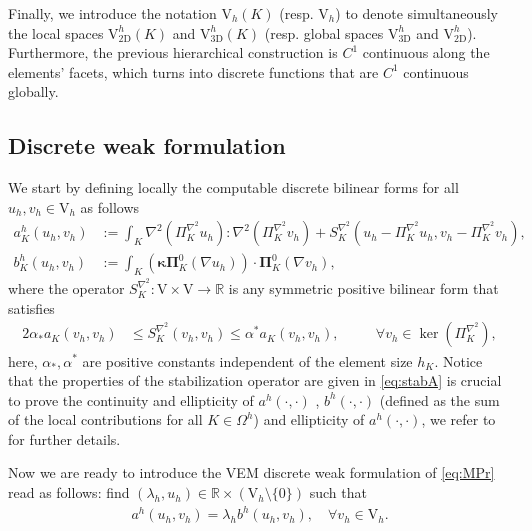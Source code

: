 \documentclass[final,reqno]{elsarticle}
\def\bkappa{\boldsymbol{\kappa}}
\def\bPi{\mathbf{\Pi}}
\def\rV{\mathrm{V}}
\begin{document}
Finally, we introduce the notation $\rV_h(K)$ (resp. $\rV_h$) to denote simultaneously the local spaces $\rV^h_{\mathrm{2D}}(K)$ and $\rV^h_{3\mathrm{D}}(K)$ (resp. global spaces $\rV^h_{\mathrm{3D}}$ and $\rV^h_{2\mathrm{D}}$).  
Furthermore, the previous hierarchical construction is $C^1$ continuous along the elements' facets, which turns into discrete functions that are $C^1$ continuous globally.

\subsection{Discrete weak formulation}
We start by defining locally the computable discrete bilinear forms for all $u_h,v_h\in\rV_h$ as follows
\begin{align*}
    a^h_K(u_h,v_h)&:=\int_{K}\nabla^2 (\Pi_{K}^{\nabla^2} u_h): \nabla^2 (\Pi_{K}^{\nabla^2} v_h) + S_K^{\nabla^2}(u_h-\Pi_{K}^{\nabla^2} u_h,v_h-\Pi_{K}^{\nabla^2} v_h), \\
    b^h_K(u_h,v_h)&:=\int_{K}(\bkappa\bPi_{K}^{0}(\nabla u_h))\cdot \bPi_{K}^{0}(\nabla v_h),%
\end{align*}
where the operator $S_{K}^{\nabla^2}%
:\rV\times\rV\to \mathbb{R}$ is any symmetric positive bilinear form that satisfies  
\begin{alignat}{2}
    \alpha_{*}a_{K}(v_h,v_h)&\leq S_{K}^{\nabla^2}(v_h,v_h)\leq  \alpha^{*}a_{K}(v_h,v_h),\quad  &&\forall v_h\in \ker(\Pi_{K}^{\nabla^2}),\label{eq:stabA}
\end{alignat}
here, %
$\alpha_*,\alpha^*$
are positive constants independent of the element size $h_K$. Notice that the properties of the stabilization operator are given in \eqref{eq:stabA}%
is crucial to prove the continuity and ellipticity of $a^h(\cdot,\cdot)$ , $b^h(\cdot,\cdot)$ 
(defined as the sum of the local contributions for all $K\in\Omega^h$) and ellipticity of $a^h(\cdot,\cdot)$, we refer to \cite{DV_camwa2022,MV2} for further details.

Now we are ready to introduce the VEM discrete weak formulation of \eqref{eq:MPr} read as follows: find $(\lambda_h,u_h)\in \mathbb{R}\times (\rV_h\setminus \{0\})$ such that
\begin{align}\label{WDPr}
    a^h(u_h,v_h) = \lambda_h b^h(u_h,v_h), \quad \forall v_h\in \rV_h.
\end{align}
\end{document}
